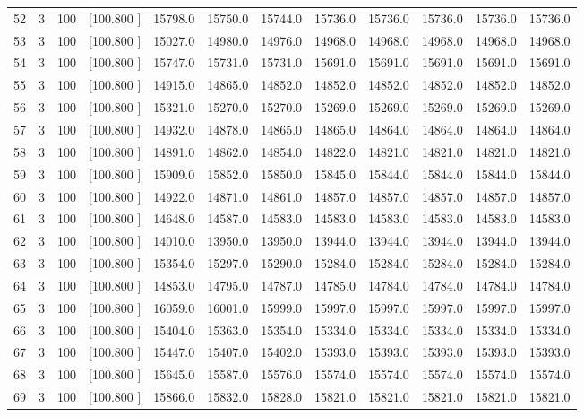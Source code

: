 \documentclass[12pt,a4paper]{article}
\begin{document}
\begin{center}
{\begin{tabular}{r r r r r r r r r r r r}
  52&  3&100&[100.800   ]& 15798.0& 15750.0& 15744.0& 15736.0& 15736.0& 15736.0& 15736.0& 15736.0\\[-0.02in]
  53&  3&100&[100.800   ]& 15027.0& 14980.0& 14976.0& 14968.0& 14968.0& 14968.0& 14968.0& 14968.0\\[-0.02in]
  54&  3&100&[100.800   ]& 15747.0& 15731.0& 15731.0& 15691.0& 15691.0& 15691.0& 15691.0& 15691.0\\[-0.02in]
  55&  3&100&[100.800   ]& 14915.0& 14865.0& 14852.0& 14852.0& 14852.0& 14852.0& 14852.0& 14852.0\\[-0.02in]
  56&  3&100&[100.800   ]& 15321.0& 15270.0& 15270.0& 15269.0& 15269.0& 15269.0& 15269.0& 15269.0\\[-0.02in]
  57&  3&100&[100.800   ]& 14932.0& 14878.0& 14865.0& 14865.0& 14864.0& 14864.0& 14864.0& 14864.0\\[-0.02in]
  58&  3&100&[100.800   ]& 14891.0& 14862.0& 14854.0& 14822.0& 14821.0& 14821.0& 14821.0& 14821.0\\[-0.02in]
  59&  3&100&[100.800   ]& 15909.0& 15852.0& 15850.0& 15845.0& 15844.0& 15844.0& 15844.0& 15844.0\\[-0.02in]
  60&  3&100&[100.800   ]& 14922.0& 14871.0& 14861.0& 14857.0& 14857.0& 14857.0& 14857.0& 14857.0\\[-0.02in]
  61&  3&100&[100.800   ]& 14648.0& 14587.0& 14583.0& 14583.0& 14583.0& 14583.0& 14583.0& 14583.0\\[-0.02in]
  62&  3&100&[100.800   ]& 14010.0& 13950.0& 13950.0& 13944.0& 13944.0& 13944.0& 13944.0& 13944.0\\[-0.02in]
  63&  3&100&[100.800   ]& 15354.0& 15297.0& 15290.0& 15284.0& 15284.0& 15284.0& 15284.0& 15284.0\\[-0.02in]
  64&  3&100&[100.800   ]& 14853.0& 14795.0& 14787.0& 14785.0& 14784.0& 14784.0& 14784.0& 14784.0\\[-0.02in]
  65&  3&100&[100.800   ]& 16059.0& 16001.0& 15999.0& 15997.0& 15997.0& 15997.0& 15997.0& 15997.0\\[-0.02in]
  66&  3&100&[100.800   ]& 15404.0& 15363.0& 15354.0& 15334.0& 15334.0& 15334.0& 15334.0& 15334.0\\[-0.02in]
  67&  3&100&[100.800   ]& 15447.0& 15407.0& 15402.0& 15393.0& 15393.0& 15393.0& 15393.0& 15393.0\\[-0.02in]
  68&  3&100&[100.800   ]& 15645.0& 15587.0& 15576.0& 15574.0& 15574.0& 15574.0& 15574.0& 15574.0\\[-0.02in]
  69&  3&100&[100.800   ]& 15866.0& 15832.0& 15828.0& 15821.0& 15821.0& 15821.0& 15821.0& 15821.0\\[-0.02in]

\end{tabular}}
\end{center}
\end{document}
